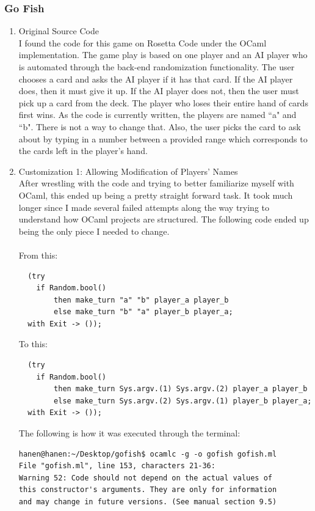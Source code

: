 \subsubsection{Go Fish}
\begin{enumerate}
\item Original Source Code \\I found the code for this game on Rosetta Code under the OCaml implementation. The game play is based on one player and an AI player who is automated through the back-end randomization functionality. The user chooses a card and asks the AI player if it has that card. If the AI player does, then it must give it up. If the AI player does not, then the user must pick up a card from the deck. The player who loses their entire hand of cards first wins. As the code is currently written, the players are named ``a" and ``b". There is not a way to change that. Also, the user picks the card to ask about by typing in a number between a provided range which corresponds to the cards left in the player's hand.
\item Customization 1: Allowing Modification of Players' Names \\After wrestling with the code and trying to better familiarize myself with OCaml, this ended up being a pretty straight forward task. It took much longer since I made several failed attempts along the way trying to understand how OCaml projects are structured. The following code ended up being the only piece I needed to change. \\ \\
From this:
\begin{verbatim}
  (try
    if Random.bool()
        then make_turn "a" "b" player_a player_b
        else make_turn "b" "a" player_b player_a;
  with Exit -> ());
\end{verbatim}

To this:
\begin{verbatim}
  (try
    if Random.bool()
        then make_turn Sys.argv.(1) Sys.argv.(2) player_a player_b
        else make_turn Sys.argv.(2) Sys.argv.(1) player_b player_a;
  with Exit -> ());
\end{verbatim}

The following is how it was executed through the terminal:
\begin{verbatim}
hanen@hanen:~/Desktop/gofish$ ocamlc -g -o gofish gofish.ml
File "gofish.ml", line 153, characters 21-36:
Warning 52: Code should not depend on the actual values of
this constructor's arguments. They are only for information
and may change in future versions. (See manual section 9.5)
\end{verbatim}


\end{enumerate}
